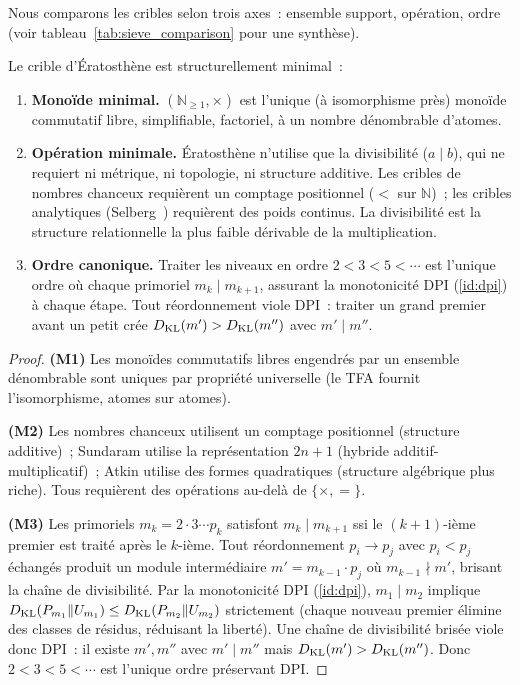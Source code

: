 \documentclass[12pt,a4paper]{article}
\begin{document}
Nous comparons les cribles selon trois axes~: ensemble support,
opération, ordre (voir tableau~\ref{tab:sieve_comparison} pour une
synthèse).

\mTHM
\begin{theoreme}
\label{thm:N3}
Le crible d'Ératosthène est structurellement minimal~:
\begin{enumerate}[label=\textbf{(M\arabic*)}]
\item \textbf{Monoïde minimal.} $(\mathbb{N}_{\geq 1}, \times)$ est
  l'unique (à isomorphisme près) monoïde commutatif libre, simplifiable,
  factoriel, à un nombre dénombrable d'atomes.
\item \textbf{Opération minimale.} Ératosthène n'utilise que la
  divisibilité ($a \mid b$), qui ne requiert ni métrique, ni topologie,
  ni structure additive. Les cribles de nombres chanceux requièrent un
  comptage positionnel ($<$ sur $\mathbb{N}$)~; les cribles analytiques
  (Selberg~\cite{Selberg1949}) requièrent des poids continus. La
  divisibilité est la structure relationnelle la plus faible dérivable
  de la multiplication.
\item \textbf{Ordre canonique.} Traiter les niveaux en ordre
  $2 < 3 < 5 < \cdots$ est l'unique ordre où chaque primoriel
  $m_k \mid m_{k+1}$, assurant la monotonicité DPI (\cref{id:dpi}) à
  chaque étape. Tout réordonnement viole DPI~: traiter un grand
  premier avant un petit crée $D_{\mathrm{KL}}(m') > D_{\mathrm{KL}}(m'')$ avec
  $m' \mid m''$.
\end{enumerate}

\begin{proof}
\textbf{(M1)} Les monoïdes commutatifs libres engendrés par un
ensemble dénombrable sont uniques par propriété universelle (le TFA
fournit l'isomorphisme, atomes sur atomes).

\textbf{(M2)} Les nombres chanceux utilisent un comptage positionnel
(structure additive)~; Sundaram utilise la représentation $2n+1$
(hybride additif-multiplicatif)~; Atkin utilise des formes
quadratiques (structure algébrique plus riche). Tous requièrent des
opérations au-delà de $\{\times, =\}$.

\textbf{(M3)} Les primoriels $m_k = 2 \cdot 3 \cdots p_k$ satisfont
$m_k \mid m_{k+1}$ ssi le $(k+1)$-ième premier est traité après le
$k$-ième. Tout réordonnement $p_i \to p_j$ avec $p_i < p_j$ échangés
produit un module intermédiaire $m' = m_{k-1} \cdot p_j$ où
$m_{k-1} \nmid m'$, brisant la chaîne de divisibilité. Par la
monotonicité DPI (\cref{id:dpi}), $m_1 \mid m_2$ implique
$D_{\mathrm{KL}}(P_{m_1}\|U_{m_1}) \leq D_{\mathrm{KL}}(P_{m_2}\|U_{m_2})$ strictement
(chaque nouveau premier élimine des classes de résidus, réduisant la
liberté). Une chaîne de divisibilité brisée viole donc DPI~: il existe
$m', m''$ avec $m' \mid m''$ mais $D_{\mathrm{KL}}(m') > D_{\mathrm{KL}}(m'')$.
Donc $2 < 3 < 5 < \cdots$ est l'unique ordre préservant DPI.
\end{proof}
\end{theoreme}
\end{document}
